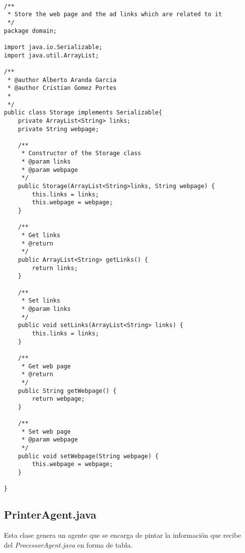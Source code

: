 \documentclass{pre-tfg}
\begin{document}
\begin{lstlisting}[caption=Código que almacena los links junto a la página web de donde fueron recuperados,style=java]

/**
 * Store the web page and the ad links which are related to it
 */
package domain;

import java.io.Serializable;
import java.util.ArrayList;

/**
 * @author Alberto Aranda Garcia
 * @author Cristian Gomez Portes
 *
 */
public class Storage implements Serializable{
	private ArrayList<String> links;
	private String webpage;
	
	/**
	 * Constructor of the Storage class
	 * @param links
	 * @param webpage
	 */
	public Storage(ArrayList<String>links, String webpage) {
		this.links = links;
		this.webpage = webpage;
	}
	
	/**
	 * Get links
	 * @return
	 */
	public ArrayList<String> getLinks() {
		return links;
	}
	
	/**
	 * Set links
	 * @param links
	 */
	public void setLinks(ArrayList<String> links) {
		this.links = links;
	}
	
	/**
	 * Get web page
	 * @return
	 */
	public String getWebpage() {
		return webpage;
	}
	
	/**
	 * Set web page
	 * @param webpage
	 */
	public void setWebpage(String webpage) {
		this.webpage = webpage;
	}
	
}
\end{lstlisting}

\subsection{PrinterAgent.java}

Esta clase genera un agente que se encarga de pintar la información que recibe del \textit{ProcessorAgent.java} en forma de tabla.
\end{document}
